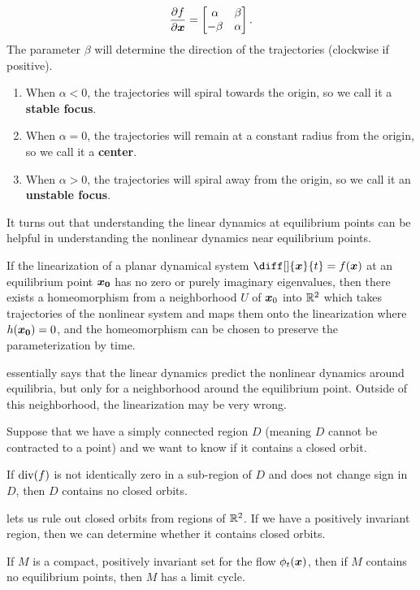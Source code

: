 \begin{enumerate}
\[			\frac{\partial f}{\partial \boldsymbol{x}} = \begin{bmatrix} \alpha & \beta \\ -\beta & \alpha \end{bmatrix}.
		\]
		The parameter $\beta$ will determine the direction of the trajectories
		(clockwise if positive).
		\begin{enumerate}
			\item When $\alpha < 0$, the trajectories will spiral towards the origin,
				so we call it a \textbf{stable focus}.
			\item When $\alpha = 0$, the trajectories will remain at a constant radius
				from the origin, so we call it a \textbf{center}.
			\item When $\alpha > 0$, the trajectories will spiral away from the
				origin, so we call it an \textbf{unstable focus}.
		\end{enumerate}
\end{enumerate}
It turns out that understanding the linear dynamics at equilibrium points can be helpful in
understanding the nonlinear dynamics near equilibrium points.
\begin{theorem}
	If the linearization of a planar dynamical system $\diff[]{\bs{x}}{t} =
	f(\bs{x})$ at an equilibrium point $\boldsymbol{x_0}$ has no zero or purely imaginary eigenvalues, then there exists a
	homeomorphism from a neighborhood $U$ of $\boldsymbol{x}_0$ into $\mathbb{R}^2$ which takes
	trajectories of the nonlinear system and maps them onto the linearization
	where $h(\boldsymbol{x_0}) = 0$, and the homeomorphism can be chosen to preserve the
	parameterization by time.
	\label{thm:hartman-grobman}
\end{theorem}
 essentially says that the linear dynamics predict the
nonlinear dynamics around equilibria, but only for a neighborhood around the
equilibrium point. Outside of this neighborhood, the linearization may be very
wrong.

Suppose that we have a simply connected region $D$ (meaning $D$ cannot be
contracted to a point) and we want to know if it contains a closed orbit.
\begin{theorem}
	If $\operatorname*{div}(f)$ is not identically zero in a sub-region of $D$ and does not
	change sign in $D$, then $D$ contains no closed orbits.
	\label{thm:bendixons}
\end{theorem}
 lets us rule out closed orbits from regions of
$\mathbb{R}^2$. If we have a positively invariant region, then we can determine whether it
contains closed orbits.
\begin{theorem}
	If $M$ is a compact, positively invariant set for the flow $\phi_t(\boldsymbol{x})$,
	then if $M$ contains no equilibrium points, then $M$ has a limit cycle.
	\label{thm:poincare-bendixson}
\end{theorem}
